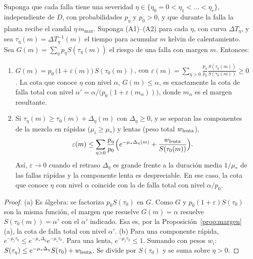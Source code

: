\begin{proposicion}\label{prop:eta}
Suponga que cada falla tiene una severidad $\eta\in\{\eta_0=0<\eta_1<\dots<\eta_r\}$,
independiente de $D$, con probabilidades $p_\eta$ y $p_0>0$, y que durante la falla la planta
recibe el caudal $\eta\,\dot m_{\max}$. Suponga (A1)--(A2) para cada $\eta$, con curva
$\Delta T_\eta$, y sea $\tau_\eta(m)=\Delta T_\eta^{-1}(m)$ el tiempo para acumular $m$ kelvin de
calentamiento. Sea $G(m)=\sum_\eta p_\eta S(\tau_\eta(m))$ el riesgo de una falla con margen
$m$. Entonces:
\begin{enumerate}
\item[(a)] $G(m)=p_0\,\big(1+\varepsilon(m)\big)\,S(\tau_0(m))$, con
  $\varepsilon(m)=\sum_{\eta>0}\frac{p_\eta}{p_0}\frac{S(\tau_\eta(m))}{S(\tau_0(m))}\ge0$.
  La cota que conoce $\eta$ con nivel $\alpha$, $G(m)\le\alpha$, es exactamente la cota de falla
  total con nivel $\alpha'=\alpha/\big(p_0(1+\varepsilon(m_\alpha))\big)$, donde $m_\alpha$ es el margen
  resultante.
\item[(b)] Si $\tau_\eta(m)\ge\tau_0(m)+\Delta_\eta(m)$ con $\Delta_\eta\ge0$, y se separan las
  componentes de la mezcla en rápidas ($\mu_i\ge\mu_\ast$) y lentas (peso total $w_{\rm lenta}$),
  \[\varepsilon(m)\le\sum_{\eta>0}\frac{p_\eta}{p_0}\Big(e^{-\mu_\ast\Delta_\eta(m)}+\frac{w_{\rm lenta}}{S(\tau_0(m))}\Big).\]
  Así, $\varepsilon\to0$ cuando el retraso $\Delta_\eta$ es grande frente a la duración media
  $1/\mu_\ast$ de las fallas rápidas y la componente lenta es despreciable. En ese caso, la cota
  que conoce $\eta$ con nivel $\alpha$ coincide con la de falla total con nivel $\alpha/p_0$.
\end{enumerate}
\end{proposicion}

\begin{proof}
(a) Es álgebra: se factoriza $p_0S(\tau_0)$ en $G$. Como $G$ y $p_0(1+\varepsilon)S(\tau_0)$ son la
misma función, el margen que resuelve $G(m)=\alpha$ resuelve $S(\tau_0(m))=\alpha'$ con el
$\alpha'$ indicado. Esa es, por la Proposición~\ref{prop:margen}(a), la cota de falla total con
nivel $\alpha'$.
(b) Para una componente rápida, $e^{-\mu_i\tau_\eta}\le e^{-\mu_\ast\Delta_\eta}e^{-\mu_i\tau_0}$. Para una
lenta, $e^{-\mu_i\tau_\eta}\le1$. Sumando con pesos $w_i$:
$S(\tau_\eta)\le e^{-\mu_\ast\Delta_\eta}S(\tau_0)+w_{\rm lenta}$. Se divide por $S(\tau_0)$ y se
suma sobre $\eta>0$.
\end{proof}

